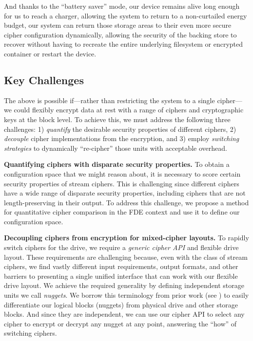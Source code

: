 And thanks to the ``battery saver'' mode, our device remains alive long enough
for us to reach a charger, allowing the system to return to a non-curtailed
energy budget, our system can return those storage areas to their even more
secure cipher configuration dynamically, allowing the security of the backing
store to recover without having to recreate the entire underlying filesystem or
encrypted container or restart the device.

\subsection{Key Challenges}

The above is possible if---rather than restricting the system to a single cipher---we could
flexibly encrypt data at rest with a range of ciphers and cryptographic keys at
the block level. To achieve this, we must address the following three
challenges: 1) \emph{quantify} the desirable security properties of different
ciphers, 2) \emph{decouple} cipher implementations from the encryption, and 3)
employ \emph{switching strategies} to dynamically ``re-cipher'' those units with
acceptable overhead. 

\textbf{Quantifying ciphers with disparate security properties.} To obtain a
configuration space that we might reason about, it is necessary to score certain
security properties of stream ciphers. This is challenging since different
ciphers have a wide range of disparate security properties, including ciphers
that are not length-preserving in their output. To address this
challenge, we propose a method for quantitative cipher comparison in the FDE
context and use it to define our configuration space. 

\textbf{Decoupling ciphers from encryption for mixed-cipher layouts.}
To rapidly switch ciphers for the drive, we require a \emph{generic cipher API} and flexible drive
layout. These requirements are challenging because, even with the class of stream ciphers, we find vastly
different input requirements, output formats, and other barriers to presenting
 a single unified interface that can work with our flexible drive
layout. We achieve the required generality by defining independent
storage units we call \emph{nuggets}. We borrow this terminology from prior work (see \cite{StrongBox})
to easily differentiate our logical blocks (nuggets) from physical drive and
other storage blocks. And since they are independent, we can use our cipher API
to select any cipher to encrypt or decrypt any nugget at any point, answering
the ``how'' of switching ciphers.

